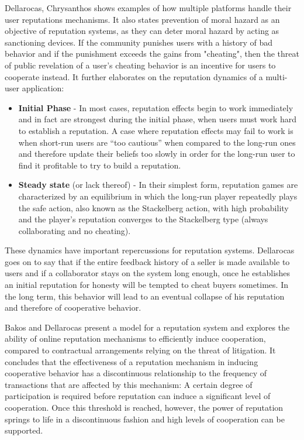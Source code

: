 Dellarocas, Chrysanthos \cite{Dellarocas2005-rep-mech} shows examples of how multiple platforms handle their user reputations mechanisms. It also states prevention of moral hazard as an objective of reputation systems, as they can deter moral hazard by acting as sanctioning devices. If the community punishes users with a history of bad behavior and if the punishment exceeds the gains from "cheating", then the threat of public revelation of a user's cheating behavior is an incentive for users to cooperate instead. It further elaborates on the reputation dynamics of a multi-user application: 
\begin{itemize}
    \item \textbf{Initial Phase} - In most cases, reputation effects begin to work immediately and in fact are strongest during the initial phase, when users must work hard to establish a reputation. A case where reputation effects may fail to work is when short-run users are “too cautious” when compared to the long-run ones and therefore update their beliefs too slowly in order for the long-run user to find it profitable to try to build a reputation.
    \item \textbf{Steady state} (or lack thereof) - In their simplest form, reputation games are characterized by an equilibrium in which the long-run player repeatedly plays the safe action, also known as the Stackelberg action, with high probability and the player’s reputation converges to the Stackelberg type (always collaborating and no cheating).
\end{itemize}

These dynamics have important repercussions for reputation systems. Dellarocas goes on to say that if the entire feedback history of a seller is made available to users and if a collaborator stays on the system long enough, once he establishes an initial reputation for honesty will be tempted to cheat buyers sometimes. In the long term, this behavior will lead to an eventual collapse of his reputation and therefore of cooperative behavior.

Bakos and Dellarocas \cite{Bakos2003} present a model for a reputation system and explores the ability of online reputation mechanisms to efficiently induce cooperation, compared to contractual arrangements relying on the threat of litigation. It concludes that the effectiveness of a reputation mechanism in inducing cooperative behavior has a discontinuous relationship to the frequency of transactions that are affected by this mechanism: A certain degree of participation is required before reputation can induce a significant level of cooperation. Once this threshold is reached, however, the power of reputation springs to life in a discontinuous fashion and high levels of cooperation can be supported.

